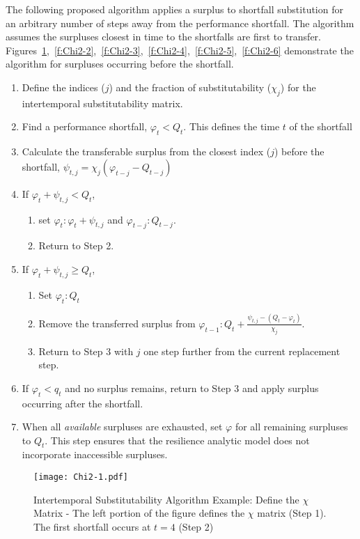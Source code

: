 \noindent  The following proposed algorithm applies a
surplus to shortfall substitution for an arbitrary number of steps away from the performance
shortfall. The algorithm assumes the surpluses closest in time to the
shortfalls are first to
transfer. Figures~\ref{f:Chi2-1},~\ref{f:Chi2-2},~\ref{f:Chi2-3},~\ref{f:Chi2-4},~\ref{f:Chi2-5},~\ref{f:Chi2-6}
demonstrate the 
algorithm for surpluses 
occurring before the shortfall. 

\begin{enumerate}
\item Define the indices ($j$) and the fraction of substitutability
  ($\chi_j$) for the intertemporal substitutability matrix.
\item Find a performance shortfall, $\varphi_t < Q_t$. This defines
  the time $t$ of the shortfall 
\item Calculate the transferable surplus from the closest index ($j$) before the
  shortfall, $\psi_{t,j} = \chi_{j}(\varphi_{t-j}-Q_{t-j})$
\item If $\varphi_t + \psi_{t,j} < Q_t$,
  \begin{enumerate}
  \item set $\varphi_t:\varphi_t + \psi_{t,j}$ and
    $\varphi_{t-j}:Q_{t-j}$.
  \item Return to Step 2.
  \end{enumerate}
\item If $\varphi_t + \psi_{t,j} \geq Q_t$,
  \begin{enumerate}
  \item Set $\varphi_t:Q_t$
  \item Remove the transferred surplus from
    $\varphi_{t-1} : Q_t + \frac{\psi_{t,j} - (Q_t -
    \varphi_t)}{\chi_{j}}$.
  \item  Return to Step 3 with $j$ one step further from the current
    replacement step.
  \end{enumerate}
\item If $\varphi_t<q_t$ and no surplus remains, return to Step 3
  and apply surplus occurring after the shortfall.
\item When all \emph{available} surpluses are exhausted, set $\varphi$
  for all remaining surpluses to $Q_t$. This step ensures that
  the resilience analytic model does not incorporate inaccessible surpluses. 
\end{enumerate}
    

 
\begin{figure}[h]
  \centering\texttt{[image: Chi2-1.pdf]}
  \caption{Intertemporal Substitutability Algorithm Example: Define
    the $\chi$ Matrix - The left portion of the figure defines
    the $\chi$ matrix (Step 1). The first shortfall occurs at
    $t=4$ (Step 2)}
  \label{f:Chi2-1}
\end{figure}



